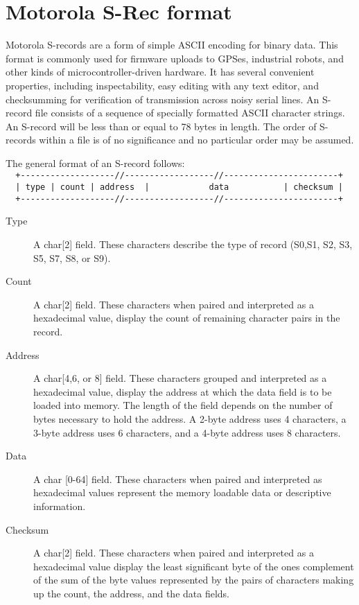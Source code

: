 \clearpage
\section{Motorola S-Rec format}
    Motorola S-records are a form of simple ASCII encoding for binary data. This format is commonly used for firmware uploads to GPSes, industrial robots, and other kinds of microcontroller-driven hardware. It has several convenient properties, including inspectability, easy editing with any text editor, and checksumming for verification of transmission across noisy serial lines. An S-record file consists of a sequence of specially formatted ASCII character strings. An S-record will be less than or equal to 78 bytes in length. The order of S-records within a file is of no significance and no particular order may be assumed.

    The general format of an S-record follows:\\
    {
        \usecodefont
        \verb'  +-------------------//------------------//-----------------------+'\\
        \verb'  | type | count | address  |            data           | checksum |'\\
        \verb'  +-------------------//------------------//-----------------------+'\\
    }

    \begin{description}
        \item[Type]
            A char[2] field. These characters describe the type of record (S0,S1, S2, S3, S5, S7, S8, or S9).

        \item[Count]
            A char[2] field. These characters when paired and interpreted as a hexadecimal value, display the count of remaining character pairs in the record.

        \item[Address]
            A char[4,6, or 8] field. These characters grouped and interpreted as a hexadecimal value, display the address at which the data field is to be loaded into memory. The length of the field depends on the number of bytes necessary to hold the address. A 2-byte address uses 4 characters, a 3-byte address uses 6 characters, and a 4-byte address uses 8 characters.

        \item[Data]
            A char [0-64] field. These characters when paired and interpreted as hexadecimal values represent the memory loadable data or descriptive information.

        \item[Checksum]
            A char[2] field. These characters when paired and interpreted as a hexadecimal value display the least significant byte of the ones complement of the sum of the byte values represented by the pairs of characters making up the count, the address, and the data fields.
    \end{description}

